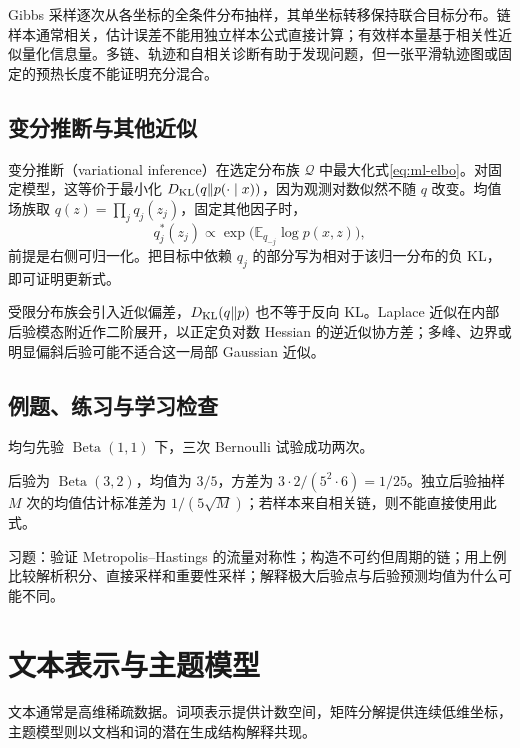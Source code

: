 \documentclass[UTF8,12pt,a4paper,fontset=fandol]{ctexbook}
\begin{document}
Gibbs 采样逐次从各坐标的全条件分布抽样，其单坐标转移保持联合目标分布。链样本通常相关，估计误差不能用独立样本公式直接计算；有效样本量基于相关性近似量化信息量。多链、轨迹和自相关诊断有助于发现问题，但一张平滑轨迹图或固定的预热长度不能证明充分混合。

\section{变分推断与其他近似}

变分推断（variational inference）在选定分布族 $\mathcal Q$ 中最大化式\eqref{eq:ml-elbo}。对固定模型，这等价于最小化 $D_{\rm KL}(q\Vert p(\cdot\mid x))$，因为观测对数似然不随 $q$ 改变。均值场族取 $q(z)=\prod_jq_j(z_j)$，固定其他因子时，
\begin{equation}
 q_j^*(z_j)\propto
 \exp\bigl(\mathbb E_{q_{-j}}\log p(x,z)\bigr),
 \label{eq:ml-mean-field}
\end{equation}
前提是右侧可归一化。把目标中依赖 $q_j$ 的部分写为相对于该归一分布的负 KL，即可证明更新式。

受限分布族会引入近似偏差，$D_{\rm KL}(q\Vert p)$ 也不等于反向 KL。Laplace 近似在内部后验模态附近作二阶展开，以正定负对数 Hessian 的逆近似协方差；多峰、边界或明显偏斜后验可能不适合这一局部 Gaussian 近似。

\section{例题、练习与学习检查}

\begin{example}[先用解析解检验近似]
均匀先验 $\operatorname{Beta}(1,1)$ 下，三次 Bernoulli 试验成功两次。
\end{example}
\begin{solve}
后验为 $\operatorname{Beta}(3,2)$，均值为 $3/5$，方差为 $3\cdot2/(5^2\cdot6)=1/25$。独立后验抽样 $M$ 次的均值估计标准差为 $1/(5\sqrt M)$；若样本来自相关链，则不能直接使用此式。
\end{solve}

习题：验证 Metropolis--Hastings 的流量对称性；构造不可约但周期的链；用上例比较解析积分、直接采样和重要性采样；解释极大后验点与后验预测均值为什么可能不同。

\chapter{文本表示与主题模型}
\label{chap:ml-text}

文本通常是高维稀疏数据。词项表示提供计数空间，矩阵分解提供连续低维坐标，主题模型则以文档和词的潜在生成结构解释共现。
\end{document}
